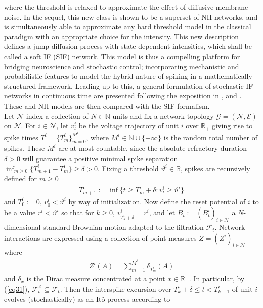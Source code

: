 \documentclass[12pt, oneside]{report}
\newcommand{\mbb}[1]{\mathbb{#1}}
\newcommand{\1}[1]{\mathbbm{1}_{\{#1\}}}
\newcommand{\mc}[1]{\mathcal{#1}}
\theoremstyle{definition}
\begin{document}
where the threshold is relaxed to approximate the effect of diffusive membrane noise.
In the sequel, this new class is shown to be a superset of NH networks, and is simultaneously able to
approximate any hard threshold model in the classical paradigm with an
appropriate choice for the intensity. This new description defines
a jump-diffusion process with state dependent intensities, which shall be called a soft
IF (SIF) network. This model is thus a compelling platform for bridging neuroscience and
stochastic control; incorporating mechanistic and probabilistic features to
model the hybrid nature of spiking in a mathematically structured framework.
Leading up to this, a general formulation of stochastic IF networks in
continuous time are presented following the exposition in
\cite{Cessac_Viéville_2008}, \cite{Cessac_2011} and
\cite[ch.5]{Gerstner_Kistler_Naud_Paninski_2014}. These and NH models are then
compared with the SIF formalism.\\[5pt]
\indent Let $\mc{N}$ index a collection of $N\in\mbb{N}$ units and fix a network
topology $\mc{G}=(\mc{N},\mc{E})$ on $\mc{N}$. For $i\in\mc{N}$, let $v^i_t$ be
the voltage trajectory of unit $i$ over $\mbb{R}_+$ giving rise to spike times
$T^i=\{T^i_m\}_{m=0}^{M^i}$, where $M^i\in\mbb{N}\cup\{+\infty\}$ is the random
total number of spikes. These $M^i$ are at most countable, since the absolute
refractory duration $\delta>0$ will guarantee a positive minimal spike
separation $\inf_{m\geq 0}\{T^i_{m+1}-T^i_m\}\geq\delta>0$. Fixing a threshold
$\vartheta^i\in\mbb{R}$, spikes are recursively defined for $m\geq 0$
\begin{align}
    T^i_{m+1}:=\inf\{t\geq T^i_m+\delta: v^i_t\geq\vartheta^i\}\label{eq31}
\end{align}
and $T^i_0:=0$, $v^i_0<\vartheta^i$ by way of initialization. Now define the
reset potential of $i$ to be a value $r^i<\vartheta^i$ so that for $k\geq 0$,
$v^i_{T^i_k+\delta}=r^i$, and let $B_t:=(B^i_t)_{i\in\mc{N}}$ a $N$-dimensional
standard Brownian motion adapted to the filtration $\mc{F}_t$. Network
interactions are expressed using a collection of point measures
$Z=(Z^i)_{i\in\mc{N}}$ where
\begin{align}
    Z^i(A)=\sum_{m=1}^{M^i}\delta_{T^i_m}(A)\label{eq20}
\end{align}
and $\delta_x$ is the Dirac measure concentrated at a point $x\in\mbb{R}_+$. In
particular, by (\ref{eq31}), $\mc{F}^Z_t\subseteq\mc{F}_t$. Then the interspike
excursion over $T^i_k+\delta\leq t < T^i_{k+1}$ of unit $i$ evolves
(stochastically) as an It\^o process according to
\end{document}

